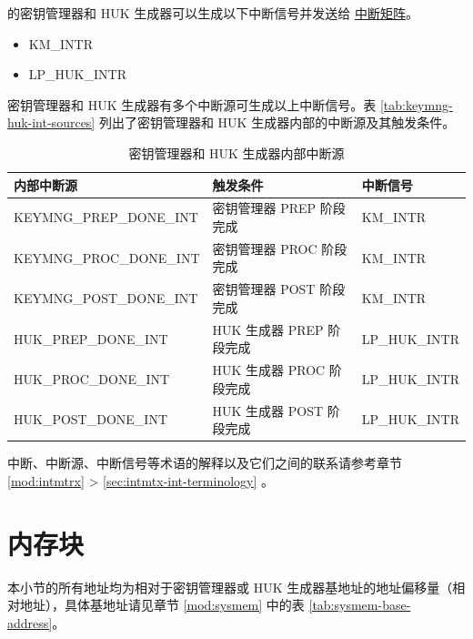 \documentclass[main\_\_CN.tex]{subfiles}
\begin{document}
\chipname{} 的密钥管理器和 HUK 生成器可以生成以下中断信号并发送给 \hyperref[mod:intmtrx]{中断矩阵}。

    \begin{itemize}
        \item KM\_INTR
        \item LP\_HUK\_INTR
    \end{itemize}

密钥管理器和 HUK 生成器有多个中断源可生成以上中断信号。表  \ref{tab:keymng-huk-int-sources} 列出了密钥管理器和 HUK 生成器内部的中断源及其触发条件。

\begin{longtable}{ | L{4.5cm} | L{8cm} | L{3cm} | }
\caption{密钥管理器和 HUK 生成器内部中断源} \label{tab:keymng-huk-int-sources}
\\ \hline
{}
\textbf{内部中断源} & \textbf{触发条件}  &  \textbf{中断信号}\\ \hline
\label{int:KEYMNGPREPDONEINT}KEYMNG\_PREP\_DONE\_INT  & 密钥管理器 PREP 阶段完成  &  KM\_INTR  \\ \hline
\label{int:KEYMNGPROCDONEINT}KEYMNG\_PROC\_DONE\_INT  &  密钥管理器 PROC 阶段完成 &  KM\_INTR  \\ \hline
\label{int:KEYMNGPOSTDONEINT}KEYMNG\_POST\_DONE\_INT  &  密钥管理器 POST 阶段完成 &  KM\_INTR  \\ \hline
\label{int:HUKPREPDONEINT}HUK\_PREP\_DONE\_INT  &  HUK 生成器 PREP 阶段完成 &  LP\_HUK\_INTR  \\ \hline
\label{int:HUKPROCDONEINT}HUK\_PROC\_DONE\_INT  & HUK 生成器 PROC 阶段完成 &  LP\_HUK\_INTR  \\ \hline
\label{int:HUKPOSTDONEINT}HUK\_POST\_DONE\_INT  & HUK 生成器 POST 阶段完成 &  LP\_HUK\_INTR  \\ \hline
\end{longtable}

\begin{tiplisting}
中断、中断源、中断信号等术语的解释以及它们之间的联系请参考章节 \ref{mod:intmtrx} \textit{} > \ref{sec:intmtx-int-terminology} \textit{}。
\end{tiplisting}

\section{内存块}

本小节的所有地址均为相对于密钥管理器或 HUK 生成器基地址的地址偏移量（相对地址），具体基地址请见章节  \ref{mod:sysmem} \textit{} 中的表  \ref{tab:sysmem-base-address}。
\end{document}
